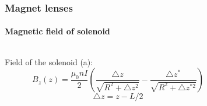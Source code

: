 \begin{frame}
  \frametitle{Magnet lenses}
  \framesubtitle{Magnetic field of solenoid}
  \rfn
  \vspace{-1cm}
  \begin{figure}
    \centering
    \hspace{0.1cm}
    \label{some example}
  \end{figure}
  \begin{tiny}
  \begin{columns}
    \begin{column}{0.5\textwidth}
      Field of the solenoid (a):
      \begin{equation}
      B_{z}\!\left(z\right)=\!\frac{\mu_{0}nI}{2}\!\left(\!\frac{\triangle z}{\sqrt{R^{2}+\triangle z^{2}}}\!-\!\frac{\triangle z^{*}}{\sqrt{R^{2}+\triangle z^{*2}}}\!\right)\!
      \end{equation}
      \begin{equation}
      \triangle z=z-L/2
      \end{equation}
    \end{column}
    \begin{column}{0.6\textwidth}

\end{column}
\end{columns}
\end{tiny}
\end{frame}
